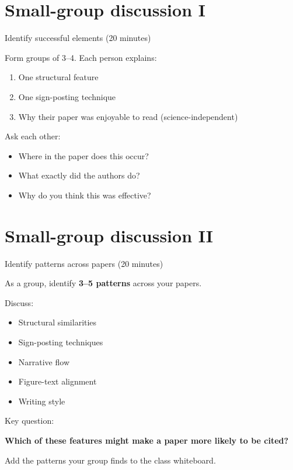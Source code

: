 \documentclass{beamer}
\begin{document}
\section{Small-group discussion I}
\begin{frame}{Identify successful elements (20 minutes)}

Form groups of 3–4.
Each person explains:

\begin{enumerate}
\item One structural feature
\item One sign-posting technique
\item Why their paper was enjoyable to read (science-independent)
\end{enumerate}

\vspace{0.5cm}

Ask each other:

\begin{itemize}
\item Where in the paper does this occur?
\item What exactly did the authors do?
\item Why do you think this was effective?
\end{itemize}

\end{frame}

\section{Small-group discussion II}
\begin{frame}{Identify patterns across papers (20 minutes)}

As a group, identify \textbf{3–5 patterns} across your papers.

Discuss:

\begin{itemize}
\item Structural similarities
\item Sign-posting techniques
\item Narrative flow
\item Figure-text alignment
\item Writing style
\end{itemize}

\vspace{0.5cm}

Key question:

\textbf{Which of these features might make a paper more likely to be cited?}

\vspace{0.5cm}
Add the patterns your group finds to the class whiteboard.

\end{frame}
\end{document}

